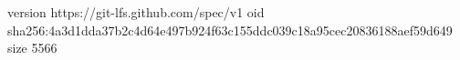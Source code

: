 version https://git-lfs.github.com/spec/v1
oid sha256:4a3d1dda37b2c4d64e497b924f63c155ddc039c18a95cec20836188aef59d649
size 5566
